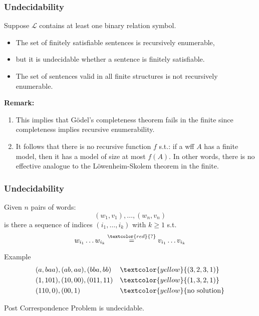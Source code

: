 \documentclass[UTF8,11pt,colorlinks,compress,openany]{beamer}%
\begin{document}
\begin{frame}\frametitle{Undecidability}
	\begin{theorem}
		Suppose $\mathscr{L}$ contains at least one binary relation symbol.
		\begin{itemize}
			\item The set of finitely satisfiable sentences is recursively enumerable,
			\item but it is undecidable whether a sentence is finitely satisfiable.
			\item The set of sentences valid in all finite structures is not recursively enumerable.
		\end{itemize}
	\end{theorem}
	\textbf{Remark:}
	\begin{enumerate}
		\item This implies that G\"odel's completeness theorem fails in the finite since completeness implies recursive enumerability.
		\item It follows that there is no recursive function $f$ s.t.: if a wff $A$ has a finite model, then it has a model of size at most $f(A)$. In other words, there is no effective analogue to the L\"owenheim-Skolem theorem in the finite.
	\end{enumerate}
\end{frame}

\begin{frame}\frametitle{Undecidability}\vspace{-1ex}
	\begin{problem}
		Given $n$ pairs of words:
		\[(w_1,v_1),\ldots,(w_n,v_n)\]
		is there a sequence of indices $(i_1,\ldots,i_k)$ with $k\geq 1$ s.t.
		\[w_{i_1}\ldots w_{i_k}\stackrel{\textcolor{red}{?}}{=}v_{i_1}\ldots v_{i_k}\]
	\end{problem}\vspace{-1ex}
\setlength\abovedisplayskip{0pt}
	\begin{block}{Example}
		\begin{align*}
		&(a,baa),(ab,aa),(bba,bb) &&\textcolor{yellow}{(3,2,3,1)}\\
		&(1,101), (10,00), (011,11) &&\textcolor{yellow}{(1,3,2,1)}\\
		&(110,0), (00,1) &&\textcolor{yellow}{\text{no solution}}
		\end{align*}
	\end{block}\vspace{-1ex}
	\begin{theorem}[Post1946]
		Post Correspondence Problem is undecidable.
	\end{theorem}
\end{frame}
\end{document}
